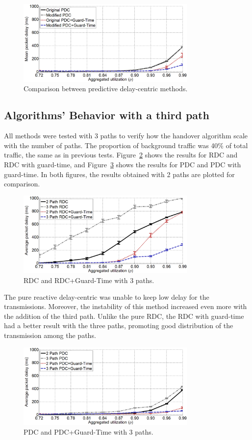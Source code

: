 \documentclass{sbrt2015}
\begin{document}
\begin{figure}[h!]
	\centering
	\includegraphics[width=8.8cm,height=4.2cm]{figura7}
	\caption{Comparison between predictive delay-centric methods.}
	\label{figura7}
\end{figure}

\subsection{Algorithms' Behavior with a third path}
All methods were tested with 3 paths to verify how the handover algorithm scale with the number of paths.
The proportion of background traffic was 40\% of total traffic, the same as in previous tests. 
Figure~\ref{figura8} shows the results for RDC and RDC with guard-time, and Figure~\ref{figura9} shows the results for PDC and PDC with guard-time. 
In both figures, the results obtained with 2 paths are plotted for comparison.


\begin{figure}[h!]
	\centering
	\includegraphics[width=8.8cm,height=4.2cm]{figura8}
	\caption{RDC and RDC+Guard-Time with 3 paths.}
	\label{figura8}
\end{figure}

The pure reactive delay-centric was unable to keep low delay for the transmissions. 
Moreover, the instability of this method increased even more with the addition of the third path.
Unlike the pure RDC, the RDC with guard-time had a better result with the three paths, promoting good distribution of the transmission among the paths.

\begin{figure}[h!]
	\centering
	\includegraphics[width=8.8cm,height=4.2cm]{figura9}
	\caption{PDC and PDC+Guard-Time with 3 paths.}
	\label{figura9}
\end{figure}
\end{document}
